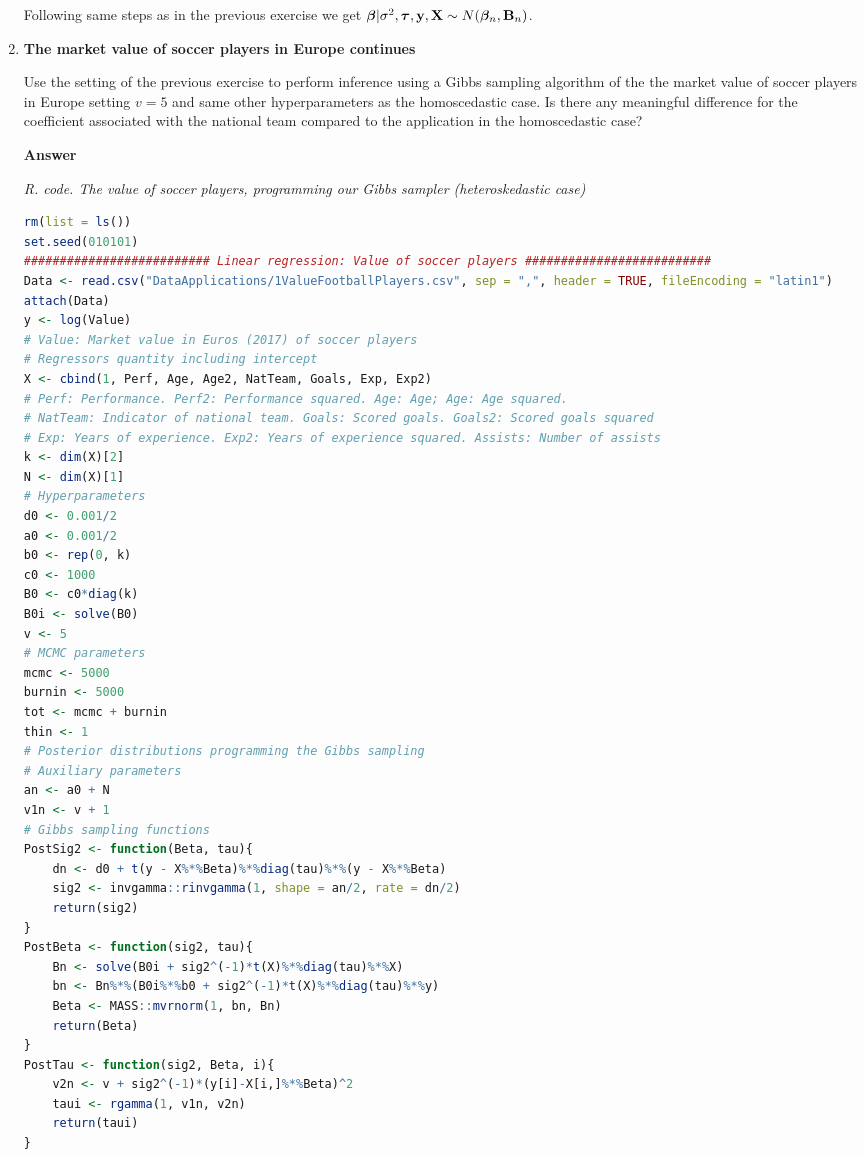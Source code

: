 \begin{enumerate}[leftmargin=*]
Following same steps as in the previous exercise we get $\bm{\beta}|\sigma^2,\bm{\tau},{\bf{y}},{\bf{X}}\sim N(\bm{\beta}_n,{\bf{B}}_n)$.

\item \textbf{The market value of soccer players in Europe continues}

Use the setting of the previous exercise to perform inference using a Gibbs sampling algorithm of the the market value of soccer players in Europe setting $v=5$ and same other hyperparameters as the homoscedastic case. Is there any meaningful difference for the coefficient associated with the national team compared to the application in the homoscedastic case?

\textbf{Answer}


\begin{tcolorbox}[enhanced,width=4.67in,center upper,
	fontupper=\large\bfseries,drop shadow southwest,sharp corners]
	\textit{R. code. The value of soccer players, programming our Gibbs sampler (heteroskedastic case)}
	\begin{VF}
		\begin{lstlisting}[language=R]		
rm(list = ls())
set.seed(010101)
########################## Linear regression: Value of soccer players ##########################
Data <- read.csv("DataApplications/1ValueFootballPlayers.csv", sep = ",", header = TRUE, fileEncoding = "latin1")
attach(Data)
y <- log(Value) 
# Value: Market value in Euros (2017) of soccer players
# Regressors quantity including intercept
X <- cbind(1, Perf, Age, Age2, NatTeam, Goals, Exp, Exp2)
# Perf: Performance. Perf2: Performance squared. Age: Age; Age: Age squared. 
# NatTeam: Indicator of national team. Goals: Scored goals. Goals2: Scored goals squared
# Exp: Years of experience. Exp2: Years of experience squared. Assists: Number of assists
k <- dim(X)[2]
N <- dim(X)[1]
# Hyperparameters
d0 <- 0.001/2
a0 <- 0.001/2
b0 <- rep(0, k)
c0 <- 1000
B0 <- c0*diag(k)
B0i <- solve(B0)
v <- 5
# MCMC parameters
mcmc <- 5000
burnin <- 5000
tot <- mcmc + burnin
thin <- 1
# Posterior distributions programming the Gibbs sampling
# Auxiliary parameters
an <- a0 + N
v1n <- v + 1
# Gibbs sampling functions
PostSig2 <- function(Beta, tau){
	dn <- d0 + t(y - X%*%Beta)%*%diag(tau)%*%(y - X%*%Beta)
	sig2 <- invgamma::rinvgamma(1, shape = an/2, rate = dn/2)
	return(sig2)
}
PostBeta <- function(sig2, tau){
	Bn <- solve(B0i + sig2^(-1)*t(X)%*%diag(tau)%*%X)
	bn <- Bn%*%(B0i%*%b0 + sig2^(-1)*t(X)%*%diag(tau)%*%y)
	Beta <- MASS::mvrnorm(1, bn, Bn)
	return(Beta)
}
PostTau <- function(sig2, Beta, i){
	v2n <- v + sig2^(-1)*(y[i]-X[i,]%*%Beta)^2
	taui <- rgamma(1, v1n, v2n)
	return(taui)
}			
\end{lstlisting}
	\end{VF}
\end{tcolorbox} 


\end{enumerate}
